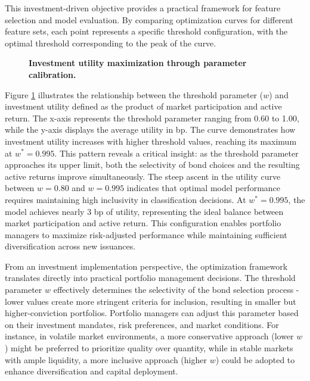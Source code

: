 This investment-driven objective provides a practical framework for feature selection and model evaluation. By comparing optimization curves for different feature sets, each point represents a specific threshold configuration, with the optimal threshold corresponding to the peak of the curve.

\begin{figure}[h]
    \begin{center}
        
    \end{center}
    \caption{\textbf{Investment utility maximization through parameter calibration.}}
    \label{fig:optimization_curve}
\end{figure}

Figure \ref{fig:optimization_curve} illustrates the relationship between the threshold parameter ($w$) and investment utility defined as the product of market participation and active return. The x-axis represents the threshold parameter ranging from 0.60 to 1.00, while the y-axis displays the average utility in bp. The curve demonstrates how investment utility increases with higher threshold values, reaching its maximum at $w^* = 0.995$. This pattern reveals a critical insight: as the threshold parameter approaches its upper limit, both the selectivity of bond choices and the resulting active returns improve simultaneously. The steep ascent in the utility curve between $w = 0.80$ and $w = 0.995$ indicates that optimal model performance requires maintaining high inclusivity in classification decisions. At $w^* = 0.995$, the model achieves nearly 3 bp of utility, representing the ideal balance between market participation and active return. This configuration enables portfolio managers to maximize risk-adjusted performance while maintaining sufficient diversification across new issuances.

From an investment implementation perspective, the optimization framework translates directly into practical portfolio management decisions. The threshold parameter $w$ effectively determines the selectivity of the bond selection process - lower values create more stringent criteria for inclusion, resulting in smaller but higher-conviction portfolios. Portfolio managers can adjust this parameter based on their investment mandates, risk preferences, and market conditions. For instance, in volatile market environments, a more conservative approach (lower $w$) might be preferred to prioritize quality over quantity, while in stable markets with ample liquidity, a more inclusive approach (higher $w$) could be adopted to enhance diversification and capital deployment.


